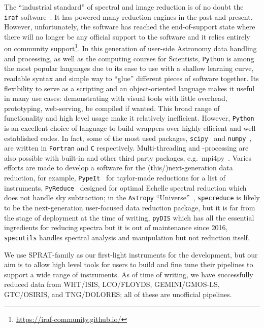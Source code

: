 \documentclass[fleqn,usenatbib]{mnras}
\begin{document}
The ``industrial standard'' of spectral and image reduction is of no doubt the
\texttt{iraf} software~\citep{1986SPIE..627..733T, 1993ASPC...52..173T}. It has powered many
reduction engines in the past and present. However, unfortunately, the software has reached
the end-of-support state where there will no longer be any official support to the software
and it relies entirely on community support\footnote{\url{https://iraf-community.github.io/}}.
In this generation of user-side Astronomy data handling and processing, as well as the
computing courses for Scientists, \texttt{Python} is among the most popular languages due to
its ease to use with a shallow learning curve, readable syntax and simple way to ``glue''
different pieces of software together. Its flexibility to serve as a scripting and an
object-oriented language makes it useful in many use cases: demonstrating with visual tools
with little overhead, prototyping, web-serving, be compiled if wanted. This broad range of
functionality and high level usage make it relatively inefficient. However, \texttt{Python}
is an excellent choice of language to build wrappers over highly efficient and well
established codes. In fact, some of the most used packages,
\texttt{scipy}~\citep{2020SciPy-NMeth} and \texttt{numpy}~\citep{2020NumPy-Array},
are written in \texttt{Fortran} and \texttt{C} respectively. Multi-threading and -processing
are also possible with built-in and other third party packages, e.g.\ mpi4py~\citep{DALCIN20111124}. 
Varies efforts are made to develop a software for the (this/)next-generation data reduction,
for example, \texttt{PypeIt}~\citep{pypeit:zenodo, pypeit:joss_pub} for taylor-made reductions
for a list of instruments, \texttt{PyReduce}~\citep{2021A&A...646A..32P} designed for optimal
Echelle spectral reduction which does not handle sky subtraction;
in the \texttt{Astropy} ``Universe''~\citep{astropy:2013, astropy:2018}, \texttt{specreduce}
is likely to be the next-generation user-focused data reduction package, but it is far from
the stage of deployment at the time of writing, \texttt{pyDIS} which has all the essential
ingredients for reducing spectra but it is out of maintenance since 2016, \texttt{specutils}
handles spectral analysis and manipulation but not reduction itself.

We use SPRAT-family as our first-light instruments for the development, but our aim is to
allow high level tools for users to build and fine tune their pipelines to support
a wide range of instruments. As of time of writing, we have successfully reduced data
from WHT/ISIS, LCO/FLOYDS, GEMINI/GMOS-LS, GTC/OSIRIS, and TNG/DOLORES; all of these are
unofficial pipelines.
\end{document}
